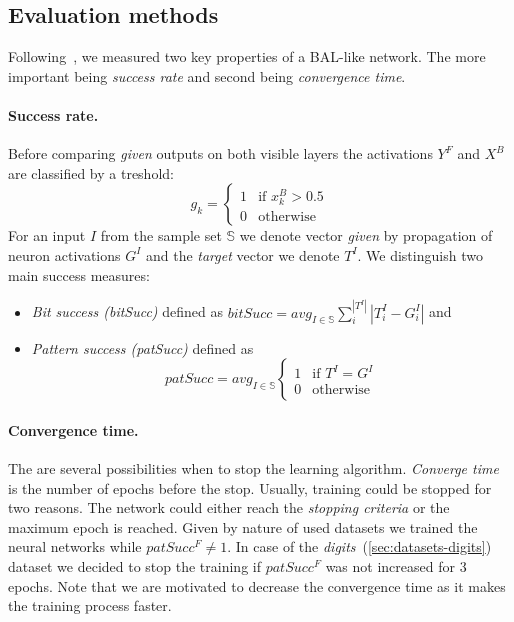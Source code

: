 
\subsection{Evaluation methods} 
\label{sec:sim-evaluation} 

Following~\citet{farkas2013bal}, we measured two key properties of a BAL-like network. The more important being \emph{success rate} and second being \emph{convergence time}. 

\paragraph{Success rate.}  
Before comparing \emph{given} outputs on both visible layers the activations $Y^F$ and $X^B$ are classified by a treshold: 
\begin{equation} 
  g_k =
  \left\{
	  \begin{array}{ll}
		  1 & \mbox{if } x_k^B > 0.5 \\
		  0 & \mbox{otherwise}
	  \end{array}
  \right.  
\end{equation} 
For an input $I$ from the sample set $\mathbb{S}$ we denote vector \emph{given} by propagation of neuron activations $G^I$ and the \emph{target} vector we denote $T^I$. We distinguish two main success measures: 

\begin{itemize}
  \item \emph{Bit success (bitSucc)} defined as $bitSucc = avg_{I \in \mathbb{S}} \sum_i^{|T^I|} |T_i^I - G^I_i|$ and 
  \item \emph{Pattern success (patSucc)} defined as 
    \begin{equation}
      patSucc = avg_{I \in \mathbb{S}} \left\{
	      \begin{array}{ll}
		      1 & \mbox{if } T^I = G^I \\
		      0 & \mbox{otherwise}
	      \end{array}
      \right.
    \end{equation} 
\end{itemize} 

\paragraph{Convergence time.} The are several possibilities when to stop the learning algorithm. \emph{Converge time} is the number of epochs before the stop. Usually, training could be stopped for two reasons. The network could either reach the \emph{stopping criteria} or the maximum epoch is reached. Given by nature of used datasets we trained the neural networks while $patSucc^F \neq 1$. In case of the \emph{digits}~(\ref{sec:datasets-digits}) dataset we decided to stop the training if $patSucc^F$ was not increased for 3 epochs. Note that we are motivated to decrease the convergence time as it makes the training process faster.  

